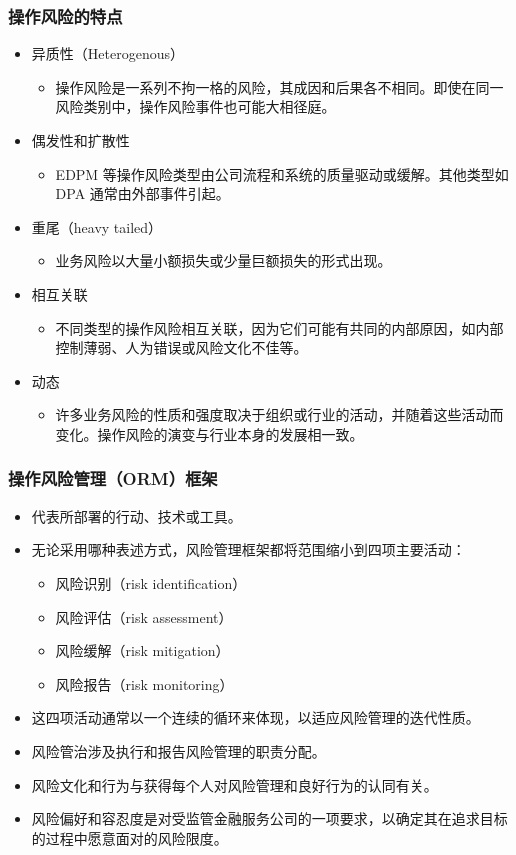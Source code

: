 \subsubsection{操作风险的特点 }
\begin{itemize}
\item 异质性（Heterogenous）
    \begin{itemize}
    \item 操作风险是一系列不拘一格的风险，其成因和后果各不相同。即使在同一风险类别中，操作风险事件也可能大相径庭。
    \end{itemize}
\item 偶发性和扩散性
    \begin{itemize}
    \item EDPM 等操作风险类型由公司流程和系统的质量驱动或缓解。其他类型如 DPA 通常由外部事件引起。
    \end{itemize}
\item 重尾（heavy tailed）
    \begin{itemize}
    \item 业务风险以大量小额损失或少量巨额损失的形式出现。
    \end{itemize}   
\item 相互关联
    \begin{itemize}
    \item 不同类型的操作风险相互关联，因为它们可能有共同的内部原因，如内部控制薄弱、人为错误或风险文化不佳等。
    \end{itemize} 
\item 动态
    \begin{itemize}
    \item 许多业务风险的性质和强度取决于组织或行业的活动，并随着这些活动而变化。操作风险的演变与行业本身的发展相一致。
    \end{itemize}
\end{itemize}

\subsubsection{操作风险管理（ORM）框架}
\begin{itemize}
\item 代表所部署的行动、技术或工具。
\item 无论采用哪种表述方式，风险管理框架都将范围缩小到四项主要活动：
    \begin{itemize}
    \item 风险识别（risk identification）
    \item 风险评估（risk assessment）
    \item 风险缓解（risk mitigation）
    \item 风险报告（risk monitoring）
    \end{itemize}
\item 这四项活动通常以一个连续的循环来体现，以适应风险管理的迭代性质。
\item 风险管治涉及执行和报告风险管理的职责分配。
\item 风险文化和行为与获得每个人对风险管理和良好行为的认同有关。
\item 风险偏好和容忍度是对受监管金融服务公司的一项要求，以确定其在追求目标的过程中愿意面对的风险限度。
\end{itemize}


